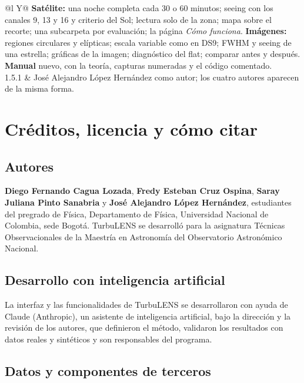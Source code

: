 \begin{table}[H]
\begin{tabularx}{\linewidth}{@{}l Y@{}}
\textbf{Satélite:} una noche completa cada 30 o 60 minutos; seeing con los canales 9, 13 y 16 y criterio del Sol; lectura
solo de la zona; mapa sobre el recorte; una subcarpeta por evaluación; la página \emph{Cómo funciona}.
\textbf{Imágenes:} regiones circulares y elípticas; escala variable como en DS9; FWHM y seeing de una estrella; gráficas
de la imagen; diagnóstico del flat; comparar antes y después.
\textbf{Manual} nuevo, con la teoría, capturas numeradas y el código comentado.\\
1.5.1 & José Alejandro López Hernández como autor; los cuatro autores aparecen de la misma forma.\\
\bottomrule
\end{tabularx}
\caption{Versiones de TurbuLENS.}
\end{table}

\chapter{Créditos, licencia y cómo citar}\label{ap:creditos}

\section*{Autores}

\textbf{Diego Fernando Cagua Lozada}, \textbf{Fredy Esteban Cruz Ospina}, \textbf{Saray Juliana Pinto Sanabria} y
\textbf{José Alejandro López Hernández}, estudiantes del pregrado de Física, Departamento de Física, Universidad Nacional de Colombia, sede
Bogotá. TurbuLENS se desarrolló para la asignatura Técnicas Observacionales de la Maestría en Astronomía del Observatorio
Astronómico Nacional.

\section*{Desarrollo con inteligencia artificial}

La interfaz y las funcionalidades de TurbuLENS se desarrollaron con ayuda de Claude (Anthropic), un asistente de
inteligencia artificial, bajo la dirección y la revisión de los autores, que definieron el método, validaron los
resultados con datos reales y sintéticos y son responsables del programa.

\section*{Datos y componentes de terceros}

